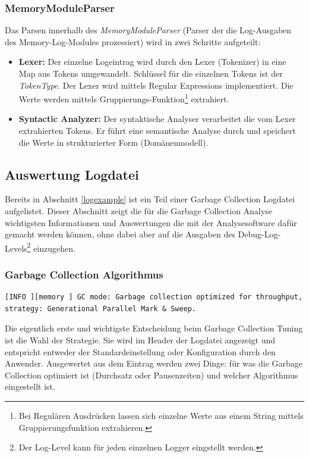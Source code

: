 \subsubsection{MemoryModuleParser}
Das Parsen innerhalb des \textit{MemoryModuleParser} (Parser der die Log-Ausgaben des Memory-Log-Modules prozessiert) wird in zwei Schritte aufgeteilt:
\begin{itemize}
\item \textbf{Lexer: }Der einzelne Logeintrag wird durch den Lexer (Tokenizer) in eine Map aus Tokens umgewandelt. Schlüssel für die einzelnen Tokens ist der \textit{TokenType}. Der Lexer wird mittels Regular Expressions implementiert. Die Werte werden mittels Gruppierungs-Funktion\footnote{Bei Regulären Ausdrücken lassen sich einzelne Werte aus einem String mittels Gruppierungsfunktion extrahieren.} extrahiert. 
\item \textbf{Syntactic Analyzer: }Der syntaktische Analyser verarbeitet die vom Lexer extrahierten Tokens. Er führt eine semantische Analyse durch und speichert die Werte in strukturierter Form (Domänenmodell).
\end{itemize}

\subsection{Auswertung Logdatei}
Bereits in Abschnitt \ref{logexample} ist ein Teil einer Garbage Collection Logdatei aufgelistet. Dieser Abschnitt zeigt die für die Garbage Collection Analyse wichtigsten Informationen und Auswertungen die mit der Analysesoftware dafür gemacht werden können, ohne dabei aber auf die Ausgaben des Debug-Log-Levels\footnote{Der Log-Level kann für jeden einzelnen Logger eingstellt werden.} einzugehen.

\subsubsection{Garbage Collection Algorithmus}
\begin{lstlisting}[numbers=none,  framexleftmargin=0mm, caption=Logdatei: Ausgabe initialer Garbage Collection Algorithmus]
[INFO ][memory ] GC mode: Garbage collection optimized for throughput, strategy: Generational Parallel Mark & Sweep.
\end{lstlisting}
Die eigentlich erste und wichtigste Entscheidung beim Garbage Collection Tuning ist die Wahl der Strategie. Sie wird im Header der Logdatei angezeigt und entspricht entweder der Standardeinstellung oder Konfiguration durch den Anwender. Ausgewertet aus dem Eintrag werden zwei Dinge: für was die Garbage Collection optimiert ist (Durchsatz oder Pausenzeiten) und welcher Algorithmus eingestellt ist.
	
